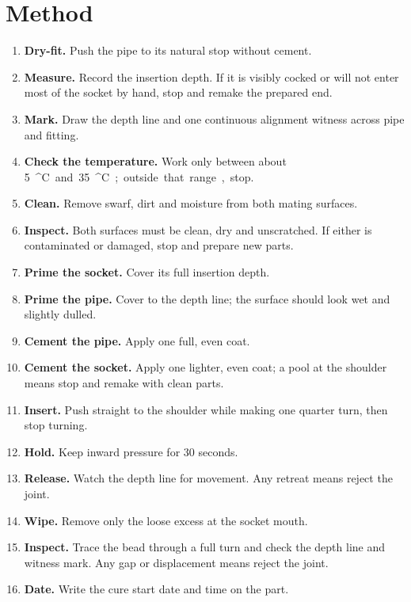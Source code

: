 \section{Method}
\begin{enumerate}
\item \textbf{Dry-fit.} Push the pipe to its natural stop without cement.
\item \textbf{Measure.} Record the insertion depth. If it is visibly cocked or
will not enter most of the socket by hand, stop and remake the prepared end.
\item \textbf{Mark.} Draw the depth line and one continuous alignment witness
across pipe and fitting.
\item \textbf{Check the temperature.} Work only between about
\qty{5}{^\circ C} and \qty{35}{^\circ C}; outside that range, stop.
\item \textbf{Clean.} Remove swarf, dirt and moisture from both mating surfaces.
\item \textbf{Inspect.} Both surfaces must be clean, dry and unscratched. If
either is contaminated or damaged, stop and prepare new parts.
\item \textbf{Prime the socket.} Cover its full insertion depth.
\item \textbf{Prime the pipe.} Cover to the depth line; the surface should look
wet and slightly dulled.
\item \textbf{Cement the pipe.} Apply one full, even coat.
\item \textbf{Cement the socket.} Apply one lighter, even coat; a pool at the
shoulder means stop and remake with clean parts.
\item \textbf{Insert.} Push straight to the shoulder while making one quarter
turn, then stop turning.
\item \textbf{Hold.} Keep inward pressure for 30 seconds.
\item \textbf{Release.} Watch the depth line for movement. Any retreat means
reject the joint.
\item \textbf{Wipe.} Remove only the loose excess at the socket mouth.
\item \textbf{Inspect.} Trace the bead through a full turn and check the depth
line and witness mark. Any gap or displacement means reject the joint.
\item \textbf{Date.} Write the cure start date and time on the part.
\end{enumerate}


